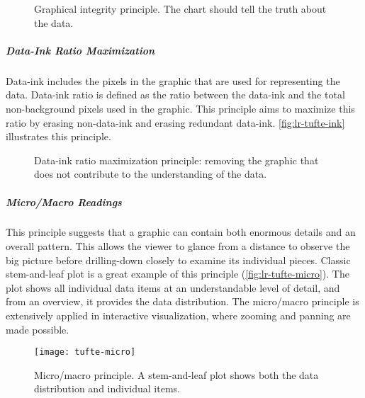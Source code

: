 \begin{figure}[!htb]
	\centering
	\hfill
	\caption{Graphical integrity principle. The chart should tell the truth about the data.}
	\label{fig:lr-tufte-integrity}
\end{figure}

\subparagraph{Data-Ink Ratio Maximization}
Data-ink includes the pixels in the graphic that are used for representing the data. Data-ink ratio is defined as the ratio between the data-ink and the total non-background pixels used in the graphic. This principle aims to maximize this ratio by erasing non-data-ink and erasing redundant data-ink. \autoref{fig:lr-tufte-ink} illustrates this principle.

\begin{figure}[!htb]
	\centering
	\hfill
	\caption{Data-ink ratio maximization principle: removing the graphic that does not contribute to the understanding of the data.}
	\label{fig:lr-tufte-ink}
\end{figure}

\subparagraph{Micro/Macro Readings}
This principle suggests that a graphic can contain both enormous details and an overall pattern. This allows the viewer to glance from a distance to observe the big picture before drilling-down closely to examine its individual pieces. Classic stem-and-leaf plot is a great example of this principle (\autoref{fig:lr-tufte-micro}). The plot shows all individual data items at an understandable level of detail, and from an overview, it provides the data distribution. The micro/macro principle is extensively applied in interactive visualization, where zooming and panning are made possible.

\begin{figure}[!htb]
	\centering
	\texttt{[image: tufte-micro]}
	\caption{Micro/macro principle. A stem-and-leaf plot shows both the data distribution and individual items. }
	\label{fig:lr-tufte-micro}
\end{figure}


